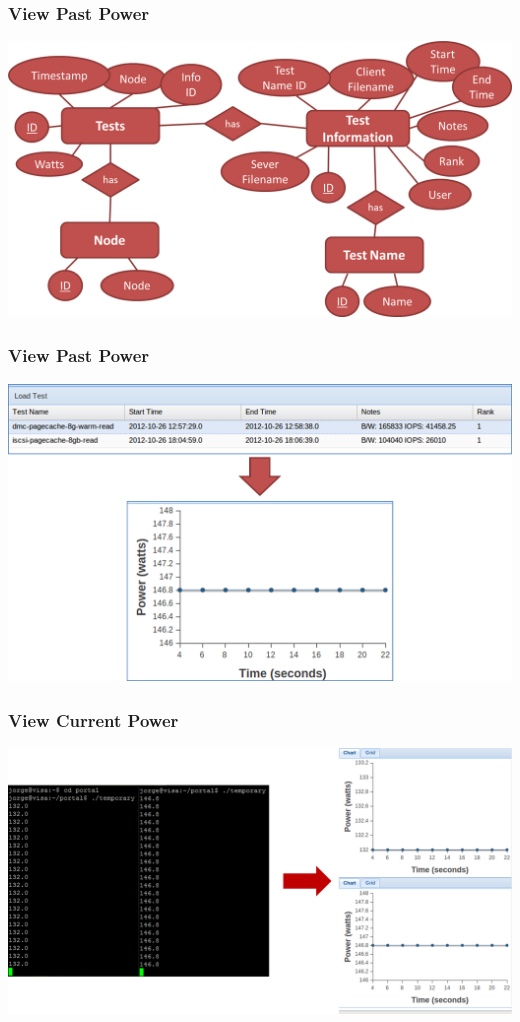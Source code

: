 \documentclass{beamer}
\begin{document}
\begin{frame}
  \frametitle{View Past Power}

  \includegraphics[width=\textwidth,keepaspectratio]{db-diagram.png}

\end{frame}

\begin{frame}
  \frametitle{View Past Power}

  \includegraphics[width=\textwidth,keepaspectratio]{test-to-graph.png}

\end{frame}

\begin{frame}
  \frametitle{View Current Power}

  \includegraphics[width=\textwidth,keepaspectratio]{reading-power.png}

\end{frame}
\end{document}
